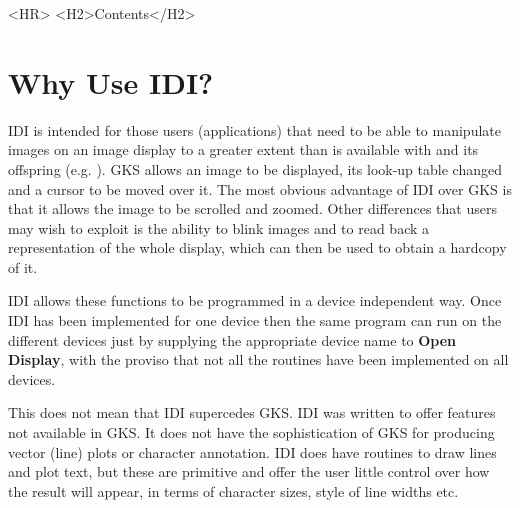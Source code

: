 %
\begin{htmlonly}
  \label{stardoccontents}
  \begin{rawhtml}
     <HR>
     <H2>Contents</H2>
  \end{rawhtml}
\end{htmlonly}
\begin{latexonly}
   \setlength{\parskip}{0mm}
   \tableofcontents
   \setlength{\parskip}{\medskipamount}
   \markright{\stardocname}
\end{latexonly}

\newpage

\section{Why Use IDI?}

IDI is intended for those users (applications) that need to be able to
manipulate images on an image display to a greater extent than is
available with  and its offspring (e.g.
). GKS allows an image to
be displayed, its look-up table changed and a cursor to be moved over it.
The most obvious advantage of IDI over GKS is that it allows the image
to be scrolled and zoomed. Other differences that users may wish to exploit
is the ability to blink images and to read back a representation of
the whole display, which can then be used to obtain a hardcopy of it.

IDI allows these functions to be programmed in a device independent way.
Once IDI has been implemented for one device then the same program can
run on the different devices just by supplying the appropriate device name
to {\bf Open Display}, with the proviso that not all the routines have
been implemented on all devices.

This does not mean that IDI supercedes GKS. IDI was written to offer
features not available in GKS. It does not have the sophistication of
GKS for producing vector (line) plots or character annotation. IDI
does have routines to draw lines and plot text, but these are primitive
and offer the user little control over how the result will appear, in
terms of character sizes, style of line widths etc.

